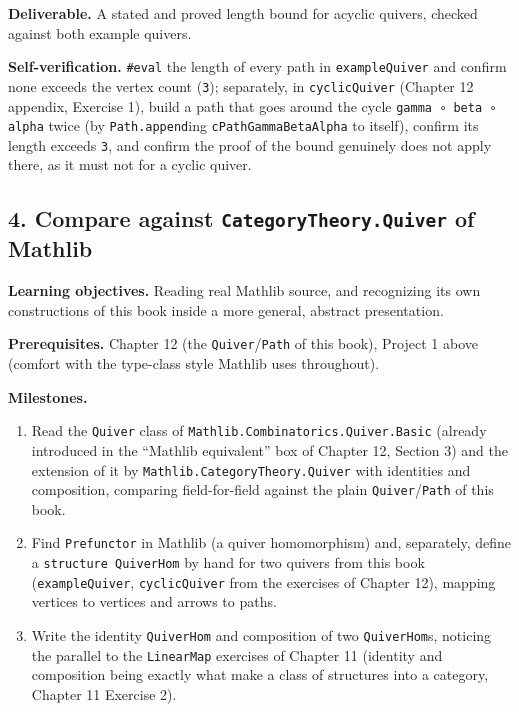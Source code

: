 \textbf{Deliverable.} A stated and proved length bound for acyclic quivers, checked against both example quivers.

\textbf{Self-verification.} \texttt{\#eval} the length of every path in \texttt{exampleQuiver} and confirm none exceeds the vertex count (\texttt{3}); separately, in \texttt{cyclicQuiver} (Chapter 12 appendix, Exercise 1), build a path that goes around the cycle \texttt{gamma ∘ beta ∘ alpha} twice (by \texttt{Path.append}ing \texttt{cPathGammaBetaAlpha} to itself), confirm its length exceeds \texttt{3}, and confirm the proof of the bound genuinely does not apply there, as it must not for a cyclic quiver.

\subsection{\texorpdfstring{4. Compare against \texttt{CategoryTheory.Quiver} of Mathlib}{4. Compare against CategoryTheory.Quiver of Mathlib}}\label{sec:14-next-steps:03-next-projects:5}

\textbf{Learning objectives.} Reading real Mathlib source, and recognizing its own constructions of this book inside a more general, abstract presentation.

\textbf{Prerequisites.} Chapter 12 (the \texttt{Quiver}/\texttt{Path} of this book), Project 1 above (comfort with the type-class style Mathlib uses throughout).

\textbf{Milestones.}

\begin{enumerate}
\def\labelenumi{\arabic{enumi}.}
\tightlist
\item
  Read the \texttt{Quiver} class of \texttt{Mathlib.Combinatorics.Quiver.Basic} (already introduced in the ``Mathlib equivalent'' box of Chapter 12, Section 3) and the extension of it by \texttt{Mathlib.CategoryTheory.Quiver} with identities and composition, comparing field-for-field against the plain \texttt{Quiver}/\texttt{Path} of this book.
\item
  Find \texttt{Prefunctor} in Mathlib (a quiver homomorphism) and, separately, define a \texttt{structure QuiverHom} by hand for two quivers from this book (\texttt{exampleQuiver}, \texttt{cyclicQuiver} from the exercises of Chapter 12), mapping vertices to vertices and arrows to paths.
\item
  Write the identity \texttt{QuiverHom} and composition of two \texttt{QuiverHom}s, noticing the parallel to the \texttt{LinearMap} exercises of Chapter 11 (identity and composition being exactly what make a class of structures into a category, Chapter 11 Exercise 2).
\end{enumerate}

